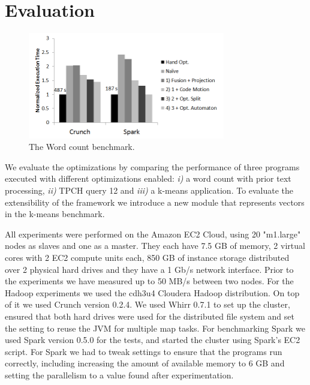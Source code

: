\section{Evaluation}
\label{sec:evaluation}
\begin{figure}[t]
    \includegraphics[width=8.6cm]{figures/word-count.png}
   \caption{The Word count benchmark.}
   \label{fig:word-count}%
\end{figure}
We evaluate the optimizations by comparing the performance of three
programs executed with different optimizations enabled:
\emph{i)} a word count with prior text processing, \emph{ii)} TPCH \cite{tpch}
query 12 and \emph{iii)} a k-means application. To evaluate the extensibility
of the framework we introduce a new \tool module that represents
vectors in the k-means benchmark.

All experiments were performed on the Amazon EC2 Cloud, using 20 "m1.large"
nodes as slaves and one as a master. They each have 7.5 GB of memory, 2 virtual
cores with 2 EC2 compute units each, 850 GB of instance storage distributed over
2 physical hard drives and they have a 1 Gb/s network interface. Prior to the
experiments we have measured up to 50 MB/s between two nodes. For the Hadoop
experiments we used the cdh3u4 Cloudera Hadoop distribution. On top of it we
used Crunch version 0.2.4. We used Whirr 0.7.1 \cite{whirr} to
set up the cluster, ensured that both hard drives were used for the
distributed file system and set the setting to reuse the JVM for
multiple map tasks.
For benchmarking Spark we used Spark version 0.5.0 for the tests, and
started the cluster using Spark's EC2 script.
For Spark we had to tweak settings to ensure that the programs run
correctly, including increasing the amount of available memory to 6 GB and
setting the parallelism to a value found after experimentation.

